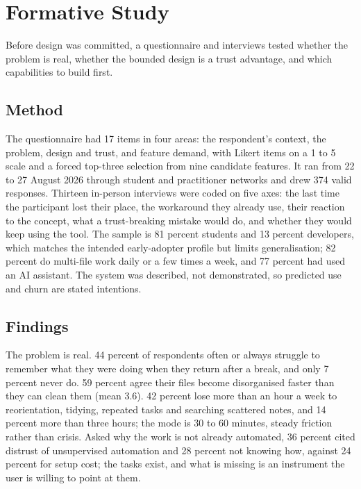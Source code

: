 \section{Formative Study}
\label{sec:formative}

Before design was committed, a questionnaire and interviews tested whether the problem is real, whether the bounded design is a trust advantage, and which capabilities to build first.

\subsection{Method}
The questionnaire had 17 items in four areas: the respondent's context, the problem, design and trust, and feature demand, with Likert items on a 1 to 5 scale and a forced top-three selection from nine candidate features. It ran from 22 to 27 August 2026 through \InstitutionName{} student and practitioner networks and drew 374 valid responses. Thirteen in-person interviews were coded on five axes: the last time the participant lost their place, the workaround they already use, their reaction to the concept, what a trust-breaking mistake would do, and whether they would keep using the tool. The sample is 81 percent students and 13 percent developers, which matches the intended early-adopter profile but limits generalisation; 82 percent do multi-file work daily or a few times a week, and 77 percent had used an AI assistant. The system was described, not demonstrated, so predicted use and churn are stated intentions.

\subsection{Findings}
The problem is real. 44 percent of respondents often or always struggle to remember what they were doing when they return after a break, and only 7 percent never do. 59 percent agree their files become disorganised faster than they can clean them (mean 3.6). 42 percent lose more than an hour a week to reorientation, tidying, repeated tasks and searching scattered notes, and 14 percent more than three hours; the mode is 30 to 60 minutes, steady friction rather than crisis. Asked why the work is not already automated, 36 percent cited distrust of unsupervised automation and 28 percent not knowing how, against 24 percent for setup cost; the tasks exist, and what is missing is an instrument the user is willing to point at them.

